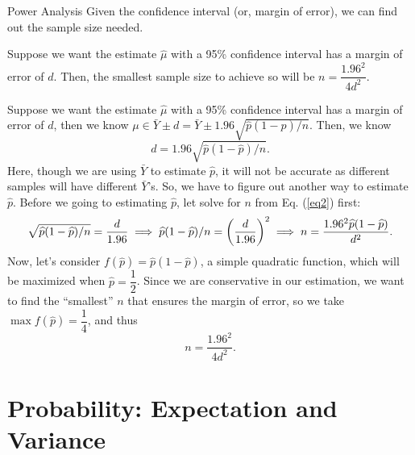 \begin{df}{Power Analysis}
	Given the confidence interval (or, margin of error), we can find out the sample size needed.	
\end{df}
\begin{thm}{}
	Suppose we want the estimate $\hat\mu$ with a 95\% confidence interval has a margin of error of $d$. Then, the smallest sample size to achieve so will be $n=\dfrac{1.96^2}{4d^2}$.
\end{thm}
\begin{prf}
	Suppose we want the estimate $\hat\mu$ with a 95\% confidence interval has a margin of error of $d$, then we know $\mu\in\bar{Y}\pm d=\bar{Y}\pm1.96\sqrt{\hat{p}(1-\hat{p})/n}$. Then, we know \begin{equation}\label{eq2} d=1.96\sqrt{\hat{p}(1-\hat{p})/n}.\end{equation} Here, though we are using $\bar{Y}$ to estimate $\hat{p}$, it will not be accurate as different samples will have different $\bar{Y}$'s. So, we have to figure out another way to estimate $\hat{p}$. Before we going to estimating $\hat{p}$, let solve for $n$ from Eq. (\ref{eq2}) first: \[\sqrt{\widehat{p}(1-\widehat{p})/n}=\dfrac{d}{1.96}\implies\widehat{p}(1-\widehat{p})/n=\qty(\dfrac{d}{1.96})^2\implies n = \dfrac{1.96^2\widehat{p}(1-\widehat{p})}{d^2}.\] Now, let's consider $f(\hat{p})=\hat{p}(1-\hat{p})$, a simple quadratic function, which will be maximized when $\hat{p}=\dfrac{1}{2}$. Since we are conservative in our estimation, we want to find the ``smallest'' $n$ that ensures the margin of error, so we take $\max f(\hat{p})=\dfrac{1}{4}$, and thus \[n=\dfrac{1.96^2}{4d^2}.\]
\end{prf}

\newpage
\section{Probability: Expectation and Variance}
